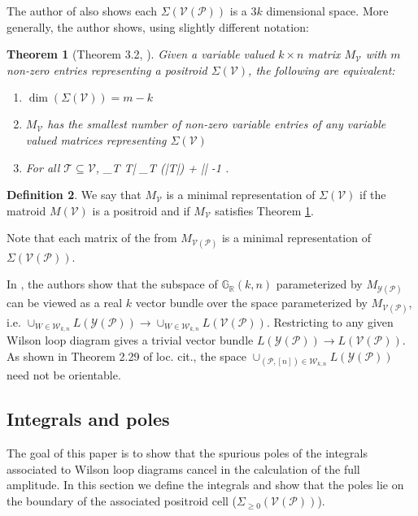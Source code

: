 \documentclass[11pt]{article}
\newcommand{\R}{\mathbb{R}}
\newcommand{\Grall}{\mathbb{G}_{\R}}
\def\bas #1\eas{\begin{align*} #1 \end{align*}}
\newcommand{\cP}{\mathcal{P}}
\newcommand{\cV}{\mathcal{V}}
\newcommand{\cY}{\mathcal{Y}}
\newcommand{\VP}{\cV(\cP)}
\newcommand{\YP}{\cY(\cP)}
\newcommand{\Sigmapos}{\Sigma_{\geq 0}}
\newcommand{\cW}{\mathcal{W}}
\newtheorem{thm}{Theorem}[section]
\theoremstyle{remark}
\theoremstyle{definition}
\newtheorem{dfn}[thm]{Definition}
\begin{document}
The author of \cite{basisshapeloci} also shows each $\Sigma(\VP)$ is a $3k$ dimensional space. More generally, the author shows, using slightly different notation:

\begin{thm}[Theorem 3.2, \cite{basisshapeloci}]\label{res:minimalrep}
Given a variable valued $k \times n$ matrix $M_\cV$ with $m$ non-zero entries representing a positroid  $\Sigma(\cV)$, the following are equivalent:
\begin{enumerate}
\item $\dim(\Sigma(\cV)) = m -k$ 
\item $M_\cV$ has the smallest number of non-zero variable entries of any variable valued matrices representing $\Sigma(\cV)$
\item For all $\mathcal{T} \subseteq \cV$, \bas |\bigcup_{T \in {}}T| \geq \max_{T \in  {}} (|T|) + || -1 \;. \eas
\end{enumerate}
\end{thm}

\begin{dfn}
We say that $M_{\cV}$ is a minimal representation of $\Sigma(\cV)$ if the matroid $M(\cV)$ is a positroid and if $M_{\cV}$ satisfies Theorem \ref{res:minimalrep}.
\end{dfn}

Note that each matrix of the from $M_{\VP}$ is a minimal representation of $\Sigma(\VP)$. 

In \cite[section 2.3]{non-orientable}, the authors show that  the subspace of $\Grall(k,n)$ parameterized by $M_{\YP}$ can be viewed as a real $k$ vector bundle over the space parameterized by $M_{\VP}$, i.e.  $\cup_{W \in \cW_{k,n}}L(\YP) \rightarrow \cup_{W \in \cW_{k,n}}L(\VP)$. Restricting to any given Wilson loop diagram gives a trivial vector bundle $L(\YP) \rightarrow L(\VP)$. As shown in Theorem 2.29 of loc. cit., the space $\cup_{(\cP, [n]) \in \cW_{k,n}}L(\YP)$ need not be orientable. 


\subsection{Integrals and poles \label{sec:integrals}}

The goal of this paper is to show that the spurious poles of the integrals associated to Wilson loop diagrams cancel in the calculation of the full amplitude. In this section we define the integrals and show that the poles lie on the boundary of the associated positroid cell ($\Sigmapos(\VP)$).
\end{document}
